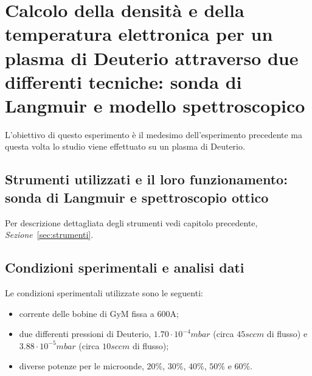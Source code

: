 \chapter{Calcolo della densità e della temperatura elettronica per un plasma di Deuterio attraverso due differenti tecniche: sonda di Langmuir e modello spettroscopico}


L'obiettivo di questo esperimento è il medesimo dell'esperimento precedente ma questa volta lo studio viene effettuato su un plasma di Deuterio.

\section{Strumenti utilizzati e il loro funzionamento: sonda di Langmuir e spettroscopio ottico}
Per descrizione dettagliata degli strumenti vedi capitolo precedente, \textit{Sezione}~\ref{sec:strumenti}.

\section{Condizioni sperimentali e analisi dati}
Le condizioni sperimentali utilizzate sono le seguenti:
\begin{itemize}
 \item corrente delle bobine di GyM fissa a $600\si{\ampere}$;
 \item due differenti pressioni di Deuterio, $1.70\cdot10^{-4}mbar$ (circa $45sccm$ di flusso) e $3.88\cdot10^{-5}mbar$ (circa $10sccm$ di flusso);
 \item diverse potenze per le microonde, $20\%$, $30\%$, $40\%$, $50\%$ e $60\%$.
\end{itemize}


